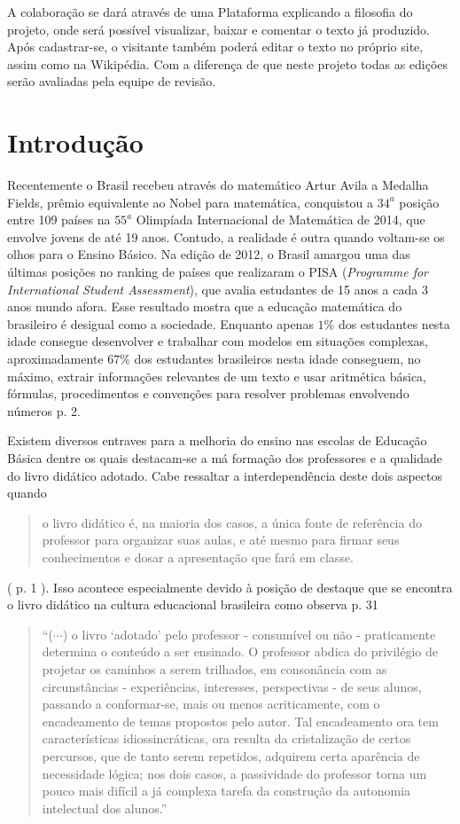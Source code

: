 \documentclass[10 pt]{article}
\begin{document}
A colaboração se dará através de uma Plataforma explicando a filosofia do projeto, onde será possível visualizar, baixar e comentar o texto já produzido.
Após cadastrar-se, o visitante também poderá editar o texto no próprio site, assim como na Wikipédia.
Com a diferença de que neste projeto todas as edições serão avaliadas pela equipe de revisão.

\section{Introdução}


Recentemente o Brasil recebeu através do matemático Artur Avila a Medalha Fields, prêmio equivalente ao Nobel para matemática, conquistou a $34^a$ posição entre 109 países na $55^a$ Olimpíada Internacional de Matemática de 2014, que envolve jovens de até 19 anos.
Contudo, a realidade é outra quando voltam-se os olhos para o Ensino Básico. Na edição de 2012, o Brasil amargou uma das últimas posições no ranking de países que realizaram o PISA ({\it Programme for International Student Assessment}), que avalia estudantes de 15 anos a cada 3 anos mundo afora.
Esse resultado mostra que a educação matemática do brasileiro é desigual como a sociedade.
Enquanto apenas $1\%$ dos estudantes nesta idade consegue desenvolver e trabalhar com modelos em situações complexas, aproximadamente $67\%$ dos estudantes brasileiros nesta idade conseguem, no máximo, extrair informações relevantes de um texto e usar aritmética básica, fórmulas, procedimentos e convenções para resolver problemas envolvendo números \cite[Country Note - Brazil]{pisa2012} p. 2.

Existem diversos entraves para a melhoria do ensino nas escolas de Educação Básica dentre os quais destacam-se a má formação dos professores e a qualidade do livro didático adotado.
Cabe ressaltar a interdependência deste dois aspectos quando \blockquote{o livro didático é, na maioria dos casos, a única fonte de referência do professor para organizar suas aulas, e até mesmo para firmar seus conhecimentos e dosar a apresentação que fará em classe.} (\cite{lima2001exame} p. 1 ). 
Isso acontece especialmente devido à posição de destaque que se encontra o livro didático na cultura educacional brasileira como observa  \cite{machado} p. 31
\blockquote{``($\cdots$) o livro `adotado' pelo professor - consumível ou não - praticamente determina o conteúdo a ser ensinado. O professor abdica do privilégio de projetar os caminhos a serem trilhados, em consonância com as circunstâncias - experiências, interesses, perspectivas - de seus alunos, passando a conformar-se, mais ou menos acriticamente, com o encadeamento de temas propostos pelo autor. Tal encadeamento ora tem características idiossincráticas, ora resulta da cristalização de certos percursos, que de tanto serem repetidos, adquirem certa aparência de necessidade lógica; nos dois casos, a passividade do professor torna um pouco mais difícil a já complexa tarefa da construção da autonomia intelectual dos alunos.''} 
\end{document}
